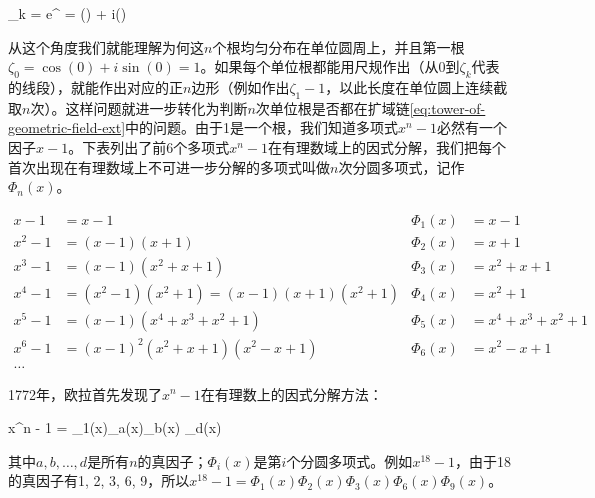 \be
\zeta_k = e^{} = \cos() + i\sin()
\ee

从这个角度我们就能理解为何这$n$个根均匀分布在单位圆周上，并且第一根$\zeta_0 = \cos(0) + i\sin(0) = 1$。如果每个单位根都能用尺规作出（从0到$\zeta_k$代表的线段），就能作出对应的正$n$边形（例如作出$\zeta_1 - 1$，以此长度在单位圆上连续截取$n$次）。这样问题就进一步转化为判断$n$次单位根是否都在扩域链\cref{eq:tower-of-geometric-field-ext}中的问题。由于1是一个根，我们知道多项式$x^n - 1$必然有一个因子$x - 1$。下表列出了前6个多项式$x^n - 1$在有理数域上的因式分解，我们把每个首次出现在有理数域上不可进一步分解的多项式叫做$n$次分圆多项式，记作$\Phi_n(x)$。

\begin{align*}
x - 1 &= x - 1 & \Phi_1(x) &= x - 1 \\
x^2 - 1 &= (x - 1)(x + 1) & \Phi_2(x) &= x + 1 \\
x^3 - 1 &= (x - 1)(x^2 + x + 1) & \Phi_3(x) &= x^2 + x + 1 \\
x^4 - 1 &= (x^2 - 1)(x^2 + 1) = (x - 1)(x + 1)(x^2 + 1) & \Phi_4(x) &= x^2 + 1 \\
x^5 - 1 &= (x - 1)(x^4 + x^3 + x^2 + 1) & \Phi_5(x) &= x^4 + x^3 + x^2 + 1 \\
x^6 - 1 &= (x - 1)^2(x^2 + x + 1)(x^2 - x + 1) & \Phi_6(x) &= x^2 - x + 1 \\
\dotso
\end{align*}

1772年，欧拉首先发现了$x^n - 1$在有理数上的因式分解方法：

\be
x^n - 1 = \Phi_1(x)\Phi_a(x)\Phi_b(x) \dotsm \Phi_d(x)
\ee

其中$a, b, \dotsc, d$是所有$n$的真因子；$\Phi_i(x)$是第$i$个分圆多项式。例如$x^{18} - 1$，由于18的真因子有1, 2, 3, 6, 9，所以$x^{18} - 1 = \Phi_1(x)\Phi_2(x)\Phi_3(x)\Phi_6(x)\Phi_9(x)$。
